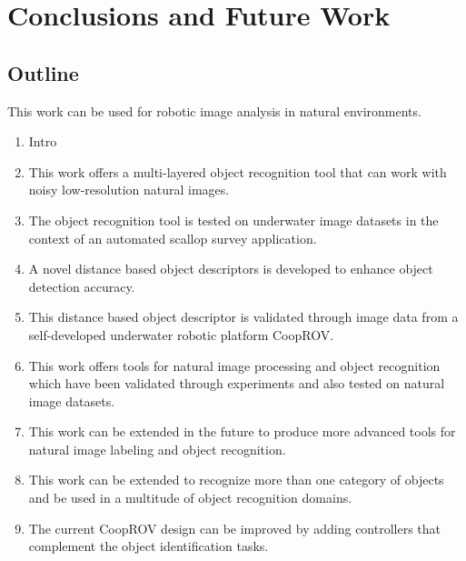 \documentclass {udthesis}
\begin{document}

\chapter{Conclusions and Future Work}
\label{chap:thesis_conclusion}

\section{Outline}


This work can be used for robotic image analysis in natural environments.

\begin{enumerate}[label=Section \arabic*:, start=0]
\item Intro

\item This work offers a multi-layered object recognition tool that can work with noisy low-resolution natural images.

\item The object recognition tool is tested on underwater image datasets in the context of an automated scallop survey application.

\item A novel distance based object descriptors is developed to enhance object detection accuracy.

\item This distance based object descriptor is validated through image data from a self-developed underwater robotic platform CoopROV.

\item This work offers tools for natural image processing and object recognition which have been validated through experiments and also tested on natural image datasets.

\item This work can be extended in the future to produce more advanced tools for natural image labeling and object recognition.

\item This work can be extended to recognize more than one category of objects and be used in a multitude of object recognition domains. 

\item The current CoopROV design can be improved by adding controllers that complement the object identification tasks.

\end{enumerate}
\end{document}

